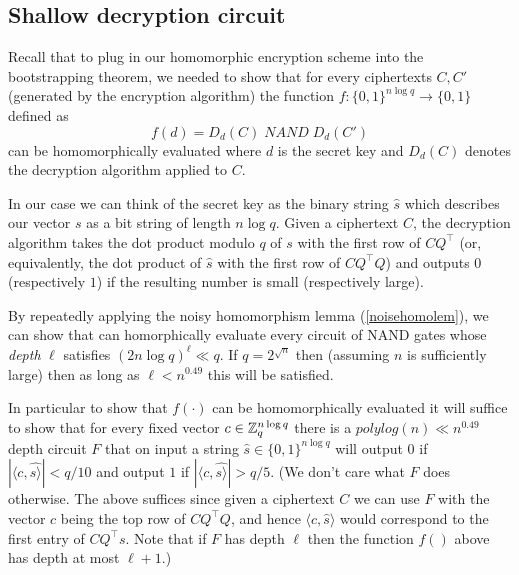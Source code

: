 \subsection{Shallow decryption circuit}\label{15-Shallow-decryption-cir}

Recall that to plug in our homomorphic encryption scheme into the
bootstrapping theorem, we needed to show that for every ciphertexts
\(C,C'\) (generated by the encryption algorithm) the function
\(f:\{0,1\}^{n \log q} \rightarrow \{0,1\}\) defined as
\begin{equation*}
f(d) = D_d(C) \;\ensuremath{\mathit{NAND}}\; D_d(C')
\end{equation*}
can be homomorphically evaluated where \(d\) is the secret key and
\(D_d(C)\) denotes the decryption algorithm applied to \(C\).

In our case we can think of the secret key as the binary string
\(\hat{s}\) which describes our vector \(s\) as a bit string of length
\(n\log q\). Given a ciphertext \(C\), the decryption algorithm takes
the dot product modulo \(q\) of \(s\) with the first row of
\(\ensuremath{\mathit{CQ}}^\top\) (or, equivalently, the dot product of
\(\hat{s}\) with the first row of \(\ensuremath{\mathit{CQ}}^\top Q\))
and outputs \(0\) (respectively \(1\)) if the resulting number is small
(respectively large).

By repeatedly applying the noisy homomorphism lemma
(\cref{noisehomolem}), we can show that can homorphically evaluate every
circuit of NAND gates whose \emph{depth} \(\ell\) satisfies
\((2n\log q)^\ell \ll q\). If \(q = 2^{\sqrt{n}}\) then (assuming \(n\)
is sufficiently large) then as long as \(\ell < n^{0.49}\) this will be
satisfied.

In particular to show that \(f(\cdot)\) can be homomorphically evaluated
it will suffice to show that for every fixed vector
\(c\in {\mathbb{Z}}_q^{n\log q}\) there is a \(polylog(n) \ll n^{0.49}\) depth
circuit \(F\) that on input a string \(\hat{s}\in\{0,1\}^{n \log q}\)
will output \(0\) if \(|\langle c,\hat{s \rangle}| < q/10\) and output
\(1\) if \(|\langle c,\hat{s \rangle}| > q/5\). (We don't care what
\(F\) does otherwise. The above suffices since given a ciphertext \(C\)
we can use \(F\) with the vector \(c\) being the top row of
\(\ensuremath{\mathit{CQ}}^\top Q\), and hence
\(\langle c,\hat{s} \rangle\) would correspond to the first entry of
\(\ensuremath{\mathit{CQ}}^\top s\). Note that if \(F\) has depth
\(\ell\) then the function \(f()\) above has depth at most \(\ell+1\).)

